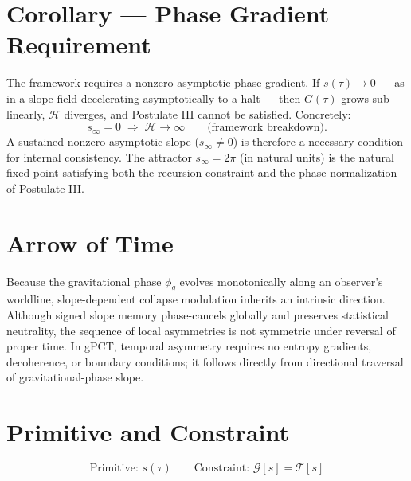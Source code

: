 \documentclass[12pt]{article}
\begin{document}
\vspace{0.7em}
\section*{Corollary — Phase Gradient Requirement}

\noindent The framework requires a nonzero asymptotic phase gradient. 
If $s(\tau) \to 0$ — as in a slope field decelerating asymptotically 
to a halt — then $G(\tau)$ grows sub-linearly, $\mathcal{H}$ diverges, 
and Postulate III cannot be satisfied. Concretely:
\[
s_\infty = 0 \;\Longrightarrow\; \mathcal{H} \to \infty 
\qquad \text{(framework breakdown).}
\]
A sustained nonzero asymptotic slope ($s_\infty \neq 0$) is therefore 
a necessary condition for internal consistency. The attractor 
$s_\infty = 2\pi$ (in natural units) is the natural fixed point 
satisfying both the recursion constraint and the phase normalization 
of Postulate III.

\vspace{0.7em}
\section*{Arrow of Time}

Because the gravitational phase $\phi_g$ evolves monotonically along an observer’s worldline, slope-dependent collapse modulation inherits an intrinsic direction. Although signed slope memory phase-cancels globally and preserves statistical neutrality, the sequence of local asymmetries is not symmetric under reversal of proper time. In gPCT, temporal asymmetry requires no entropy gradients, decoherence, or boundary conditions; it follows directly from directional traversal of gravitational-phase slope.
\vspace{0.7em}

\section*{Primitive and Constraint}

\[
{\text{Primitive: } s(\tau)}
\qquad
{\text{Constraint: } \mathcal{G}[s] = \mathcal{T}[s]}
\]
\end{document}
